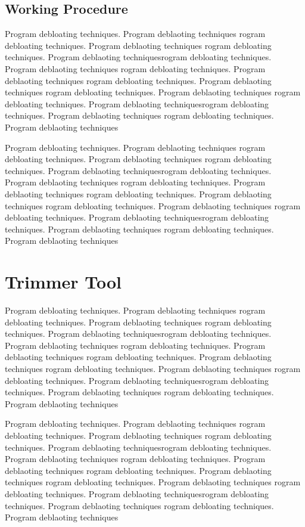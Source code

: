 \documentclass{relatorio}
\begin{document}
\subsection{Working Procedure}%
\label{Tools}

Program debloating techniques. Program deblaoting techniques rogram debloating techniques. Program deblaoting techniques
rogram debloating techniques. Program deblaoting techniquesrogram debloating techniques. Program deblaoting techniques
rogram debloating techniques. Program deblaoting techniques rogram debloating techniques. Program deblaoting techniques
rogram debloating techniques. Program deblaoting techniques 
rogram debloating techniques. Program deblaoting techniquesrogram debloating techniques. Program deblaoting techniques
rogram debloating techniques. Program deblaoting techniques

Program debloating techniques. Program deblaoting techniques rogram debloating techniques. Program deblaoting techniques
rogram debloating techniques. Program deblaoting techniquesrogram debloating techniques. Program deblaoting techniques
rogram debloating techniques. Program deblaoting techniques rogram debloating techniques. Program deblaoting techniques
rogram debloating techniques. Program deblaoting techniques 
rogram debloating techniques. Program deblaoting techniquesrogram debloating techniques. Program deblaoting techniques
rogram debloating techniques. Program deblaoting techniques

\section{Trimmer Tool}%
\label{Tools}

Program debloating techniques. Program deblaoting techniques rogram debloating techniques. Program deblaoting techniques
rogram debloating techniques. Program deblaoting techniquesrogram debloating techniques. Program deblaoting techniques
rogram debloating techniques. Program deblaoting techniques rogram debloating techniques. Program deblaoting techniques
rogram debloating techniques. Program deblaoting techniques 
rogram debloating techniques. Program deblaoting techniquesrogram debloating techniques. Program deblaoting techniques
rogram debloating techniques. Program deblaoting techniques

Program debloating techniques. Program deblaoting techniques rogram debloating techniques. Program deblaoting techniques
rogram debloating techniques. Program deblaoting techniquesrogram debloating techniques. Program deblaoting techniques
rogram debloating techniques. Program deblaoting techniques rogram debloating techniques. Program deblaoting techniques
rogram debloating techniques. Program deblaoting techniques 
rogram debloating techniques. Program deblaoting techniquesrogram debloating techniques. Program deblaoting techniques
rogram debloating techniques. Program deblaoting techniques
\end{document}
